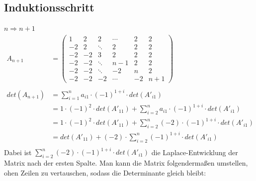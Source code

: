 \documentclass{article} %
\begin{document}
\subsection*{Induktionsschritt}
\(n \Rightarrow n+1\)
\begin{align*}
    A_{n+1} & =
\begin{pmatrix}
    1 & 2 & 2 & \cdots & 2 & 2 \\
   -2 & 2 & \ddots & 2 & 2 & 2\\
   -2 & -2 & 3 & 2 & 2 & 2 \\
   -2 & -2 & \ddots & n-1 & 2 & 2\\
   -2 & -2 & \ddots & -2 & n & 2 \\
   -2 & -2 & -2 & \cdots & -2 & n+1
\end{pmatrix} \\ \\
det(A_{n+1}) & = \sum^n_{i=1} a_{i1} \cdot (-1)^{1+i} \cdot det(A'_{i1}) \\
& = 1 \cdot (-1)^{2} \cdot det(A'_{11}) + \sum^n_{i=2} a_{i1} \cdot (-1)^{1+i} \cdot det(A'_{i1}) \\
& = 1 \cdot (-1)^{2} \cdot det(A'_{11}) + \sum^n_{i=2} (-2) \cdot (-1)^{1+i} \cdot det(A'_{i1}) \\
& =  det(A'_{11}) + (-2) \cdot \sum^n_{i=2} (-1)^{1+i} \cdot det(A'_{i1}) \\
\end{align*}
Dabei ist $ \sum^n_{i=2} (-2) \cdot (-1)^{1+i} \cdot det(A'_{i1})$ die Laplace-Entwicklung der Matrix nach der ersten Spalte. Man kann die Matrix folgendermaßen umstellen, ohen Zeilen zu vertauschen, sodass die Determinante gleich bleibt: 
\end{document}

